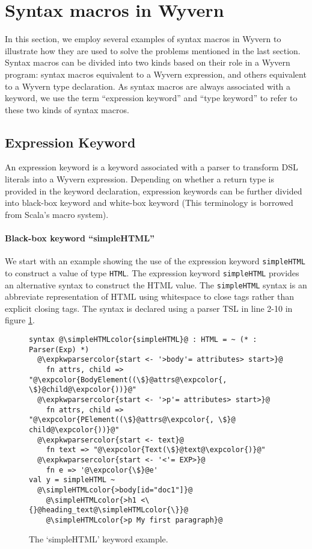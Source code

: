 \documentclass{sig-alternate}
\newcommand{\expkwparsercolor}[1]{\textcolor[HTML]{336699}{#1}}
\newcommand{\expcolor}[1]{\textcolor[HTML]{FF0033}{#1}}
\newcommand{\simpleHTMLcolor}[1]{\textcolor[HTML]{7D5100}{#1}}
\newcommand{\mycaption}[1]{\vspace{-4px}\caption{#1}\vspace{-2px}}
\begin{document}
\section{Syntax macros in Wyvern}
\label{sec-example}
In this section, we employ several examples of syntax macros in Wyvern to illustrate how they are used to solve the problems mentioned in the last section. Syntax macros can be divided into two kinds based on their role in a Wyvern program: syntax macros equivalent to a Wyvern expression, and others equivalent to a Wyvern type declaration. As syntax macros are always associated with a keyword, we use the term ``expression keyword'' and ``type keyword'' to refer to these two kinds of syntax macros.

\subsection{Expression Keyword}
An expression keyword is a keyword associated with a parser to transform DSL literals into a Wyvern expression. Depending on whether a return type is provided in the keyword declaration, expression keywords can be further divided into black-box keyword and white-box keyword (This terminology is borrowed from Scala's macro system). 

\paragraph{Black-box keyword ``simpleHTML''}
We start with an example showing the use of the expression keyword \verb|simpleHTML| to construct a value of type \verb|HTML|. The expression keyword \verb|simpleHTML| provides an alternative syntax to construct the HTML value. The \verb|simpleHTML| syntax is an abbreviate representation of HTML using whitespace to close tags rather than explicit closing tags. The syntax is declared using a parser TSL in line 2-10 in figure \ref{f-simplehtml}.

\begin{figure}[ht]
\begin{lstlisting}[style=wyvern]
syntax @\simpleHTMLcolor{simpleHTML}@ : HTML = ~ (* : Parser(Exp) *)
  @\expkwparsercolor{start <- '>body'= attributes> start>}@
    fn attrs, child => "@\expcolor{BodyElement((\$}@attrs@\expcolor{, \$}@child@\expcolor{))}@"
  @\expkwparsercolor{start <- '>p'= attributes> start>}@
    fn attrs, child => "@\expcolor{PElement((\$}@attrs@\expcolor{, \$}@ child@\expcolor{))}@"
  @\expkwparsercolor{start <- text}@
    fn text => "@\expcolor{Text(\$}@text@\expcolor{)}@"
  @\expkwparsercolor{start <- '<'= EXP>}@
    fn e => '@\expcolor{\$}@e'
val y = simpleHTML ~
  @\simpleHTMLcolor{>body[id="doc1"]}@
    @\simpleHTMLcolor{>h1 <\{}@heading_text@\simpleHTMLcolor{\}}@
    @\simpleHTMLcolor{>p My first paragraph}@
\end{lstlisting}
\mycaption{The `simpleHTML' keyword example.}
\label{f-simplehtml}
\end{figure}
\end{document}
